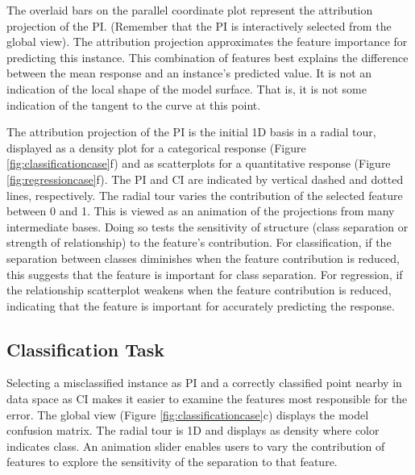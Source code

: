 \documentclass[11pt,twoside]{article}
\begin{document}
The overlaid bars on the parallel coordinate plot represent the attribution projection of the PI. (Remember that the PI is interactively selected from the global view). The attribution projection approximates the feature importance for predicting this instance. This combination of features best explains the difference between the mean response and an instance's predicted value. It is not an indication of the local shape of the model surface. That is, it is not some indication of the tangent to the curve at this point.

The attribution projection of the PI is the initial 1D basis in a radial tour, displayed as a density plot for a categorical response (Figure \ref{fig:classificationcase}f) and as scatterplots for a quantitative response (Figure \ref{fig:regressioncase}f). The PI and CI are indicated by vertical dashed and dotted lines, respectively. The radial tour varies the contribution of the selected feature between 0 and 1. This is viewed as an animation of the projections from many intermediate bases. Doing so tests the sensitivity of structure (class separation or strength of relationship) to the feature's contribution. For classification, if the separation between classes diminishes when the feature contribution is reduced, this suggests that the feature is important for class separation. For regression, if the relationship scatterplot weakens when the feature contribution is reduced, indicating that the feature is important for accurately predicting the response.

\hypertarget{classification-task}{%
\subsection{Classification Task}\label{classification-task}}

Selecting a misclassified instance as PI and a correctly classified point nearby in data space as CI makes it easier to examine the features most responsible for the error. The global view (Figure \ref{fig:classificationcase}c) displays the model confusion matrix. The radial tour is 1D and displays as density where color indicates class. An animation slider enables users to vary the contribution of features to explore the sensitivity of the separation to that feature.
\end{document}
